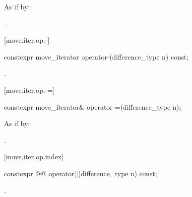 \begin{itemdescr}
\pnum
\effects As if by: 

\pnum
\returns {}.
\end{itemdescr}

[move.iter.op.-]{}

%
\begin{itemdecl}
constexpr move_iterator operator-(difference_type n) const;
\end{itemdecl}

\begin{itemdescr}
\pnum
\returns {}.
\end{itemdescr}

[move.iter.op.-=]{}

%
\begin{itemdecl}
constexpr move_iterator& operator-=(difference_type n);
\end{itemdecl}

\begin{itemdescr}
\pnum
\effects As if by: 

\pnum
\returns {}.
\end{itemdescr}

[move.iter.op.index]{}

%
\begin{itemdecl}
constexpr @@ operator[](difference_type n) const;
\end{itemdecl}

\begin{itemdescr}
\pnum
\returns {}.
\end{itemdescr}


